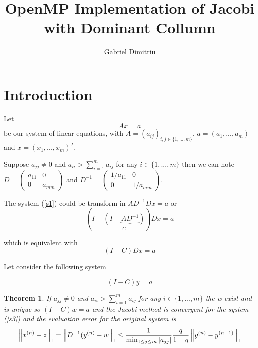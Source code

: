 \documentclass[a4paper]{article}
\newtheorem{theorem}{Theorem}
\begin{document}
\title{OpenMP Implementation of Jacobi with Dominant Collumn}
\date{}
\author{Gabriel Dimitriu}
\maketitle

\section{\protect\bigskip Introduction}

Let 
\begin{equation}
Ax=a  \label{s1}
\end{equation}%
be our system of linear equations, with $A=(a_{ij})_{i,j\in \{1,...,m\}}$, $%
a=(a_{1},...,a_{m})$ and $x=(x_{1},...,x_{m})^{T}$.

Suppose $a_{jj}\neq 0$ and $a_{ii}>\sum_{i=1}^{m}a_{ij}$ for any $i\in
\{1,...,m\}$ then we can note $D=%
\begin{pmatrix}
a_{11} & 0 \\ 
0 & a_{mm}%
\end{pmatrix}%
$ and $D^{-1}=%
\begin{pmatrix}
1/a_{11} & 0 \\ 
0 & 1/a_{mm}%
\end{pmatrix}%
$.

The system (\ref{s1}) could be transform in $AD^{-1}Dx=a$ or%
\begin{equation*}
\left( I-\underset{C}{\left( I-\underbrace{AD^{-1}}\right) }\right) Dx=a
\end{equation*}

which is equivalent with%
\begin{equation}
(I-C)Dx=a  \label{s2}
\end{equation}

Let consider the following system

\begin{equation}
(I-C)y=a  \label{s3}
\end{equation}

\begin{theorem}
If $a_{jj}\neq 0$ and $a_{ii}>\sum_{i=1}^{m}a_{ij}$ for any $i\in
\{1,...,m\} $ the w exist and is unique so $(I-C)w=a$ and the Jacobi method
is convergent for the system (\ref{s3}) and the evaluation error for the
original system is%
\begin{equation*}
\left\Vert x^{(n)}-z\right\Vert _{1}=\left\Vert D^{-1}(y^{(n)}-w\right\Vert
_{1}\leq \frac{1}{\min_{1\leq j\leq m}\left\vert a_{jj}\right\vert }\frac{q}{%
1-q}\left\Vert y^{(n)}-y^{(n-1)}\right\Vert _{1}
\end{equation*}
\end{theorem}
\end{document}
